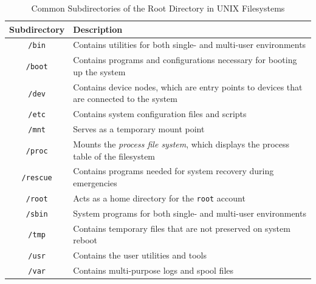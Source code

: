 \begin{table}[!htb]
	\centering
	\begin{tabular}{|c|p{}|}
		\hline
		\textbf{Subdirectory} & \textbf{Description}                                                                                                   \\
		\hline\hline
		\texttt{/bin}         & Contains utilities for both single- and multi-user environments                                                        \\ \hline
		\texttt{/boot}        & Contains programs and configurations necessary for booting up the system                                               \\ \hline
		\texttt{/dev}         & Contains device nodes, which are entry points to devices that are connected to the system \parencite{freebsd_intro}    \\ \hline
		\texttt{/etc}         & Contains system configuration files and scripts                                                                        \\ \hline
		\texttt{/mnt}         & Serves as a temporary mount point                                                                                      \\ \hline
		\texttt{/proc}        & Mounts the \textit{process file system}, which displays the process table of the filesystem \parencite{freebsd_procfs} \\ \hline
		\texttt{/rescue}      & Contains programs needed for system recovery during emergencies                                                        \\ \hline
		\texttt{/root}        & Acts as a home directory for the \texttt{root} account                                                                 \\ \hline
		\texttt{/sbin}        & System programs for both single- and multi-user environments                                                           \\ \hline
		\texttt{/tmp}         & Contains temporary files that are not preserved on system reboot                                                       \\ \hline
		\texttt{/usr}         & Contains the user utilities and tools                                                                                  \\ \hline
		\texttt{/var}         & Contains multi-purpose logs and spool files                                                                            \\ \hline
	\end{tabular}
	\caption{Common Subdirectories of the Root Directory in UNIX Filesystems \parencite{freebsd_dir_struct}}
	\label{root-subdirs}
\end{table}


